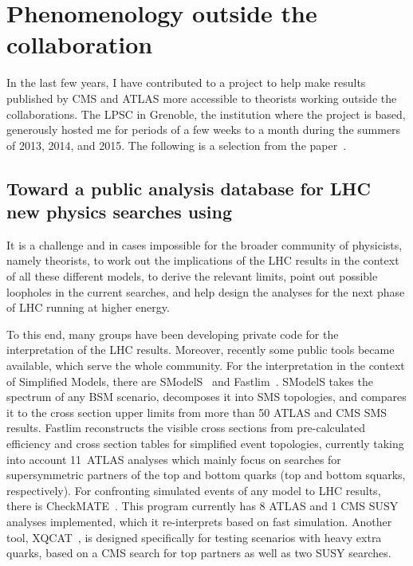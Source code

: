 \appendix

\chapter{Phenomenology outside the collaboration}
\label{chap:ma5}
In the last few years, I have contributed to a project to help make results published by CMS and ATLAS more accessible to theorists working outside the collaborations. The LPSC in Grenoble, the institution where the project is based, generously hosted me for periods of a few weeks to a month during the summers of 2013, 2014, and 2015. The following is a selection from the paper~\cite{Dumont:2014tja}.


\section{Toward a public analysis database for LHC new physics searches using \ma}
It is a challenge and in cases impossible for the broader community of physicists, namely theorists,
 to work out the implications of the LHC results 
in the context of all these different models, to derive the relevant limits, point out  
possible loopholes in the current searches, and help design the analyses for the 
next phase of LHC running at higher energy.

To this end, many groups have been developing private code for the interpretation of the LHC results. 
Moreover, recently some public tools became available, which serve the whole community. 
For the interpretation in the context of Simplified Models, there are {\sc SModelS}~\cite{Kraml:2014sna} 
and {\sc Fastlim}~\cite{Papucci:2014rja}. 
{\sc SModelS} takes the spectrum of any BSM scenario, decomposes it into SMS topologies, and compares it to the cross section upper limits from more than 50 ATLAS and CMS SMS results. 
{\sc Fastlim} reconstructs the visible cross sections from pre-calculated efficiency and cross section tables for simplified event topologies, currently taking into account 11~ATLAS analyses which mainly focus on searches for supersymmetric partners of the top and bottom quarks (top and bottom squarks, respectively).   
For confronting simulated events of any model to LHC results, there is {\sc CheckMATE}~\cite{Drees:2013wra}. 
This program currently has 8 ATLAS and 1 CMS SUSY analyses implemented, which it re-interprets based on fast simulation. 
Another tool, {\sc XQCAT}~\cite{Barducci:2014gna}, is designed specifically for testing scenarios with 
heavy extra quarks, based on a CMS search for top partners as well as two SUSY searches.
  
